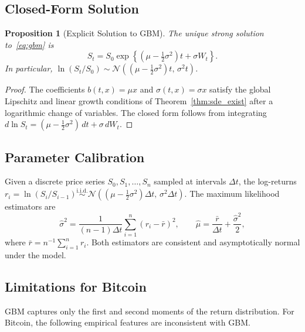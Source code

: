 \documentclass[12pt, a4paper, oneside]{report}
\theoremstyle{plain}
\newtheorem{proposition}[theorem]{Proposition}
\theoremstyle{definition}
\theoremstyle{remark}
\begin{document}
\subsection{Closed-Form Solution}

\begin{proposition}[Explicit Solution to GBM]
\label{prop:gbm_solution}
The unique strong solution to~\eqref{eq:gbm} is
\begin{equation}
\label{eq:gbm_solution}
  S_t = S_0 \exp\!\left\{\!\left(\mu - \tfrac{1}{2}\sigma^2\right)t
  + \sigma W_t\right\}.
\end{equation}
In particular, $\ln(S_t/S_0) \sim \mathcal{N}\!\left((\mu - \frac{1}{2}\sigma^2)t,\, \sigma^2 t\right)$.
\end{proposition}

\begin{proof}
The coefficients $b(t,x) = \mu x$ and $\sigma(t,x) = \sigma x$ satisfy the global
Lipschitz and linear growth conditions of Theorem~\ref{thm:sde_exist} after a
logarithmic change of variables.  The closed form follows from integrating
$d\ln S_t = (\mu - \frac{1}{2}\sigma^2)\,dt + \sigma\,dW_t$.
\end{proof}

\subsection{Parameter Calibration}

Given a discrete price series $S_0, S_1, \ldots, S_n$ sampled at intervals $\Delta t$,
the log-returns
$r_i = \ln(S_i / S_{i-1}) \overset{\text{i.i.d.}}{\sim} \mathcal{N}((\mu - \frac{1}{2}\sigma^2)\Delta t,\, \sigma^2\Delta t)$.
The maximum likelihood estimators are
\begin{equation}
  \hat\sigma^2 = \frac{1}{(n-1)\Delta t}
    \sum_{i=1}^n (r_i - \bar r)^2,
  \qquad
  \hat\mu = \frac{\bar r}{\Delta t} + \frac{\hat\sigma^2}{2},
\end{equation}
where $\bar r = n^{-1}\sum_{i=1}^n r_i$.  Both estimators are consistent and
asymptotically normal under the model.

\subsection{Limitations for Bitcoin}

GBM captures only the first and second moments of the return distribution.
For Bitcoin, the following empirical features are inconsistent with GBM.
\end{document}

